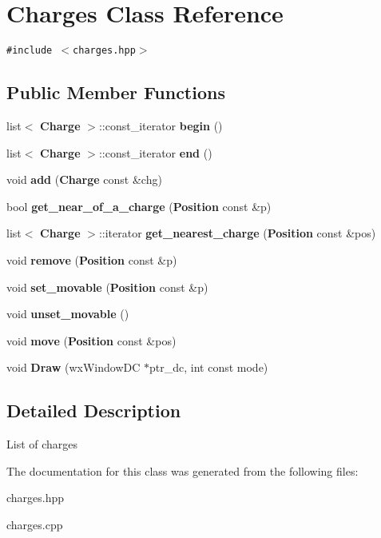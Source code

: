 \section{Charges Class Reference}
\label{classCharges}
{\tt \#include $<$charges.hpp$>$}

\subsection*{Public Member Functions}
\begin{CompactItemize}
\item 
list$<$ {\bf Charge} $>$::const\_\-iterator {\bf begin} ()\label{classCharges_a1}

\item 
list$<$ {\bf Charge} $>$::const\_\-iterator {\bf end} ()\label{classCharges_a2}

\item 
void {\bf add} ({\bf Charge} const \&chg)\label{classCharges_a3}

\item 
bool {\bf get\_\-near\_\-of\_\-a\_\-charge} ({\bf Position} const \&p)\label{classCharges_a4}

\item 
list$<$ {\bf Charge} $>$::iterator {\bf get\_\-nearest\_\-charge} ({\bf Position} const \&pos)\label{classCharges_a5}

\item 
void {\bf remove} ({\bf Position} const \&p)\label{classCharges_a6}

\item 
void {\bf set\_\-movable} ({\bf Position} const \&p)\label{classCharges_a7}

\item 
void {\bf unset\_\-movable} ()\label{classCharges_a8}

\item 
void {\bf move} ({\bf Position} const \&pos)\label{classCharges_a9}

\item 
void {\bf Draw} (wx\-Window\-DC $\ast$ptr\_\-dc, int const mode)\label{classCharges_a10}

\end{CompactItemize}


\subsection{Detailed Description}
List of charges 



The documentation for this class was generated from the following files:\begin{CompactItemize}
\item 
charges.hpp\item 
charges.cpp\end{CompactItemize}
